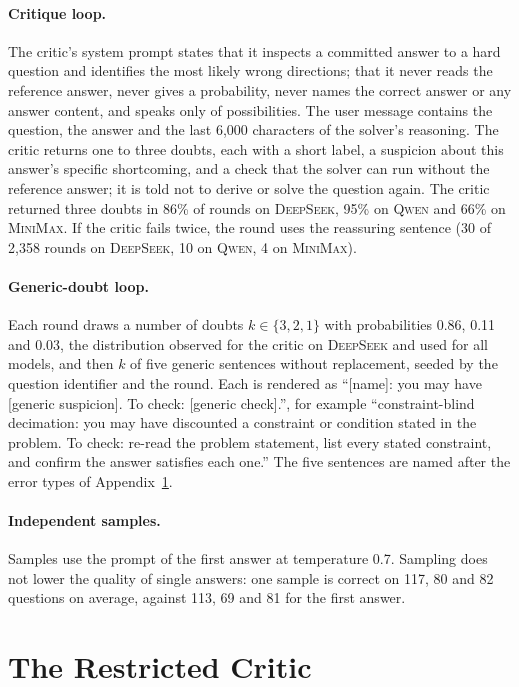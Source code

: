 \documentclass[11pt]{article}
\newcommand{\ds}{\textsc{DeepSeek}}
\newcommand{\qw}{\textsc{Qwen}}
\newcommand{\mm}{\textsc{MiniMax}}
\begin{document}
\paragraph{Critique loop.}
The critic's system prompt states that it inspects a committed answer to a hard question and identifies the most likely wrong directions; that it never reads the reference answer, never gives a probability, never names the correct answer or any answer content, and speaks only of possibilities.
The user message contains the question, the answer and the last 6{,}000 characters of the solver's reasoning.
The critic returns one to three doubts, each with a short label, a suspicion about this answer's specific shortcoming, and a check that the solver can run without the reference answer; it is told not to derive or solve the question again.
The critic returned three doubts in 86\% of rounds on \ds, 95\% on \qw{} and 66\% on \mm.
If the critic fails twice, the round uses the reassuring sentence (30 of 2{,}358 rounds on \ds, 10 on \qw, 4 on \mm).

\paragraph{Generic-doubt loop.}
Each round draws a number of doubts $k\in\{3,2,1\}$ with probabilities 0.86, 0.11 and 0.03, the distribution observed for the critic on \ds{} and used for all models, and then $k$ of five generic sentences without replacement, seeded by the question identifier and the round.
Each is rendered as ``[name]: you may have [generic suspicion]. To check: [generic check].'', for example ``constraint-blind decimation: you may have discounted a constraint or condition stated in the problem. To check: re-read the problem statement, list every stated constraint, and confirm the answer satisfies each one.''
The five sentences are named after the error types of Appendix~\ref{app:bank}.

\paragraph{Independent samples.}
Samples use the prompt of the first answer at temperature 0.7.
Sampling does not lower the quality of single answers: one sample is correct on 117, 80 and 82 questions on average, against 113, 69 and 81 for the first answer.

\section{The Restricted Critic}
\label{app:bank}
\end{document}
